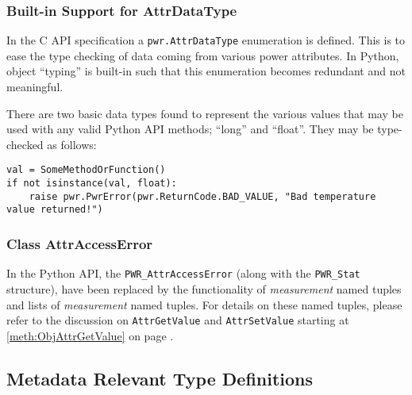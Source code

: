 \subsubsection{Built-in Support for AttrDataType}
\label{sec:PythonPwrAttrDataType}

In the C API specification a \texttt{pwr.AttrDataType} enumeration is defined.
This is to ease the type checking of data coming from various power attributes.
In Python, object ``typing'' is built-in such that this enumeration
becomes redundant and not meaningful.

There are two basic data types found to represent the various values that may
be used with any valid Python API methods; ``long'' and ``float''. They may be
type-checked as follows:

\begin{center}\begin{minipage}{.95\linewidth}\begin{lstlisting}
val = SomeMethodOrFunction()
if not isinstance(val, float):
    raise pwr.PwrError(pwr.ReturnCode.BAD_VALUE, "Bad temperature value returned!")
\end{lstlisting}\end{minipage}\end{center}

\subsubsection{Class AttrAccessError} \label{class:AttrAccessError}

In the Python API, the \texttt{PWR_AttrAccessError} (along with the
\texttt{PWR_Stat} structure), have been replaced by the functionality of
\textit{measurement} named tuples and lists of \textit{measurement} named tuples. For
details on these named tuples, please refer to the discussion on \texttt{AttrGetValue}
and \texttt{AttrSetValue} starting at \ref{meth:ObjAttrGetValue} on page
\pageref{meth:ObjAttrGetValue}.

\subsection{Metadata Relevant Type Definitions}
\label{sec:PythonMetadataRelevantTypeDefinitions}

